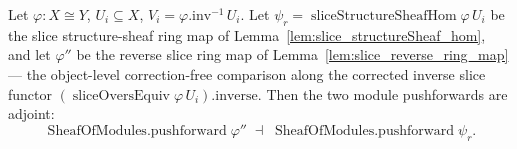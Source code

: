 \begin{lemma}\leanok
  \label{lem:pushforward_slice_two_adjunction}
  Let \(\varphi : X \cong Y\), \(U_i \subseteq X\), \(V_i = \varphi.\mathrm{inv}^{-1}\,U_i\). Let
  \(\psi_r = \operatorname{sliceStructureSheafHom}\varphi\,U_i\) be the slice structure-sheaf ring map
  of Lemma~\ref{lem:slice_structureSheaf_hom}, and let \(\varphi''\) be the reverse slice ring map of
  Lemma~\ref{lem:slice_reverse_ring_map} --- the object-level correction-free comparison along the
  corrected inverse slice functor \((\operatorname{sliceOversEquiv}\varphi\,U_i).\mathrm{inverse}\).
  Then the two module pushforwards are adjoint:
  \[
    \operatorname{SheafOfModules.pushforward}\varphi'' \;\dashv\;
    \operatorname{SheafOfModules.pushforward}\psi_r .
  \]
\end{lemma}
